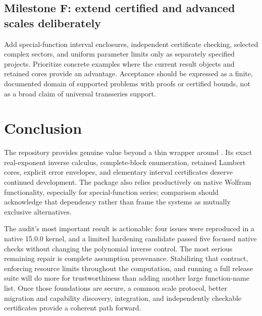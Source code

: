 \documentclass[11pt,a4paper]{article}
\newcommand{\code}[1]{\texttt{\detokenize{#1}}}
\begin{document}
\subsection{Milestone F: extend certified and advanced scales deliberately}
Add special-function interval enclosures, independent certificate checking, selected complex sectors, and uniform parameter limits only as separately specified projects. Prioritize concrete examples where the current result objects and retained cores provide an advantage. Acceptance should be expressed as a finite, documented domain of supported problems with proofs or certified bounds, not as a broad claim of universal transseries support.

\section{Conclusion}
The repository provides genuine value beyond a thin wrapper around \code{Series}. Its exact real-exponent inverse calculus, complete-block enumeration, retained Lambert cores, explicit error envelopes, and elementary interval certificates deserve continued development. The package also relies productively on native Wolfram functionality, especially for special-function series; comparison should acknowledge that dependency rather than frame the systems as mutually exclusive alternatives.

The audit's most important result is actionable: four issues were reproduced in a native 15.0.0 kernel, and a limited hardening candidate passed five focused native checks without changing the polynomial inverse control. The most serious remaining repair is complete assumption provenance. Stabilizing that contract, enforcing resource limits throughout the computation, and running a full release suite will do more for trustworthiness than adding another large function-name list. Once those foundations are secure, a common scale protocol, better migration and capability discovery, integration, and independently checkable certificates provide a coherent path forward.

\appendix
\end{document}
